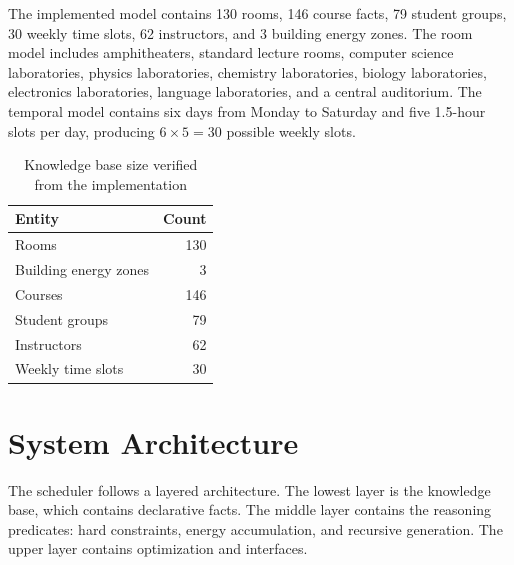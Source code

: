 \documentclass[12pt,a4paper]{article}
\begin{document}
The implemented model contains 130 rooms, 146 course facts, 79 student groups, 30 weekly time slots, 62 instructors, and 3 building energy zones. The room model includes amphitheaters, standard lecture rooms, computer science laboratories, physics laboratories, chemistry laboratories, biology laboratories, electronics laboratories, language laboratories, and a central auditorium. The temporal model contains six days from Monday to Saturday and five 1.5-hour slots per day, producing \(6 \times 5 = 30\) possible weekly slots.

\begin{table}[h]
    \centering
    \caption{Knowledge base size verified from the implementation}
    \begin{tabular}{lr}
        \toprule
        Entity & Count \\
        \midrule
        Rooms & 130 \\
        Building energy zones & 3 \\
        Courses & 146 \\
        Student groups & 79 \\
        Instructors & 62 \\
        Weekly time slots & 30 \\
        \bottomrule
    \end{tabular}
\end{table}

\section{System Architecture}

The scheduler follows a layered architecture. The lowest layer is the knowledge base, which contains declarative facts. The middle layer contains the reasoning predicates: hard constraints, energy accumulation, and recursive generation. The upper layer contains optimization and interfaces.
\end{document}
